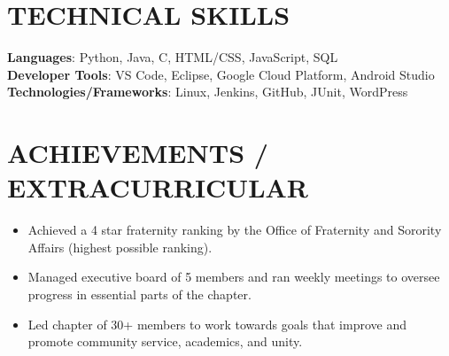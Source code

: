 \documentclass[letterpaper,10pt]{article}
\makeatletter
\newcommand{\resumeItem}[1]{
  \item\small{
    {#1 \vspace{-2pt}}
  }
}
\newcommand{\resumeSubheading}[4]{
  \vspace{-2pt}\item
    \begin{tabular*}{1.0\textwidth}[t]{l@{\extracolsep{\fill}}r}
      \textbf{#1} & \textbf{\small #2} \\
      \textit{\small#3} & \textit{\small #4} \\
    \end{tabular*}\vspace{-7pt}
}
\newcommand{\resumeSubHeadingListStart}{\begin{itemize}[leftmargin=0.0in, label={}]}
\newcommand{\resumeSubHeadingListEnd}{\end{itemize}}
\newcommand{\resumeItemListStart}{\begin{itemize}}
\newcommand{\resumeItemListEnd}{\end{itemize}\vspace{-5pt}}
\makeatother
\begin{document}
%
\section{TECHNICAL SKILLS}
 \begin{itemize}[leftmargin=0.15in, label={}]
    \small{\item{
     \textbf{Languages}{: Python, Java, C, HTML/CSS, JavaScript, SQL} \\
     \textbf{Developer Tools}{: VS Code, Eclipse, Google Cloud Platform, Android Studio} \\
     \textbf{Technologies/Frameworks}{: Linux, Jenkins, GitHub, JUnit, WordPress} \\
    }}
 \end{itemize}
 \vspace{-20pt}


\section{ACHIEVEMENTS / EXTRACURRICULAR}
    \resumeItemListStart
        \resumeItem{Achieved a 4 star fraternity ranking by the Office of Fraternity and Sorority Affairs (highest possible ranking).}
        \vspace{-5pt}
        \resumeItem{Managed executive board of 5 members and ran weekly meetings to oversee progress in essential parts of the chapter.}
        \resumeItem{Led chapter of 30+ members to work towards goals that improve and promote community service, academics, and unity.}
    \resumeItemListEnd
        

\end{document}
